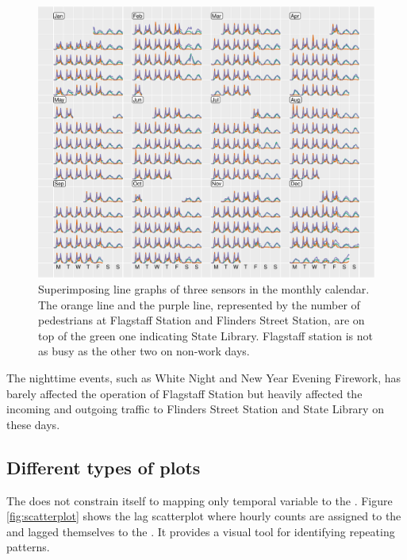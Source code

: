 \documentclass[article]{jss}
\begin{document}
\begin{CodeChunk}
\begin{figure}

{\centering \includegraphics[width=\textwidth]{figure/overlay-1} 

}

\caption[Superimposing line graphs of three sensors in the monthly calendar]{Superimposing line graphs of three sensors in the monthly calendar. The orange line and the purple line, represented by the number of pedestrians at Flagstaff Station and Flinders Street Station, are on top of the green one indicating State Library. Flagstaff station is not as busy as the other two on non-work days.}\label{fig:overlay}
\end{figure}
\end{CodeChunk}

The nighttime events, such as White Night and New Year Evening Firework,
has barely affected the operation of Flagstaff Station but heavily
affected the incoming and outgoing traffic to Flinders Street Station
and State Library on these days.

\subsection{Different types of plots}\label{different-types-of-plots}

The  does not constrain itself to mapping only
temporal variable to the . Figure \ref{fig:scatterplot} shows
the lag scatterplot where hourly counts are assigned to the  and
lagged themselves to the . It provides a visual tool for
identifying repeating patterns.
\end{document}
